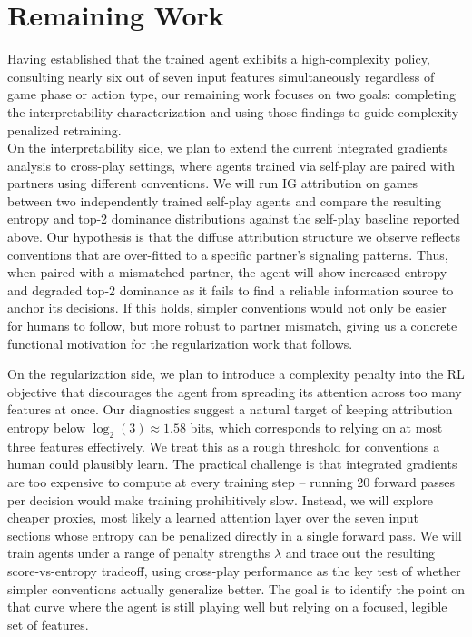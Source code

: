 \documentclass{article}
\begin{document}
\section{Remaining Work}

Having established that the trained agent exhibits a high-complexity policy, consulting nearly six out of seven input features simultaneously regardless of 
game phase or action type, our remaining work focuses on two goals: completing the interpretability characterization and using those findings to guide 
complexity-penalized retraining. \\

On the interpretability side, we plan to extend the current integrated gradients analysis to cross-play settings, where agents trained via self-play are paired with partners using different conventions. We will run IG attribution on games between two independently trained self-play agents and compare the resulting entropy and top-2 dominance distributions against the self-play baseline reported above. Our hypothesis is that the diffuse attribution structure we observe reflects conventions that are over-fitted to a specific partner's signaling patterns. Thus, when paired with a mismatched partner, the agent will show increased entropy and degraded top-2 dominance as it fails to find a reliable information source to anchor its decisions. If this holds, simpler conventions would not only be easier for humans to follow, but more robust to partner mismatch, giving us a concrete functional motivation for the regularization work that follows.

On the regularization side, we plan to introduce a complexity penalty into the RL objective that discourages the agent from spreading its attention across too many features at once. Our diagnostics suggest a natural target of keeping attribution entropy below $\log_2(3) \approx 1.58$ bits, which corresponds to relying on at most three features effectively. We treat this as a rough threshold for conventions a human could plausibly learn. The practical challenge is that integrated gradients are too expensive to compute at every training step -- running 20 forward passes per decision would make training prohibitively slow. Instead, we will explore cheaper proxies, most likely a learned attention layer over the seven input sections whose entropy can be penalized directly in a single forward pass. We will train agents under a range of penalty strengths $\lambda$ and trace out the resulting score-vs-entropy tradeoff, using cross-play performance as the key test of whether simpler conventions actually generalize better. The goal is to identify the point on that curve where the agent is still playing well but relying on a focused, legible set of features.
\end{document}
